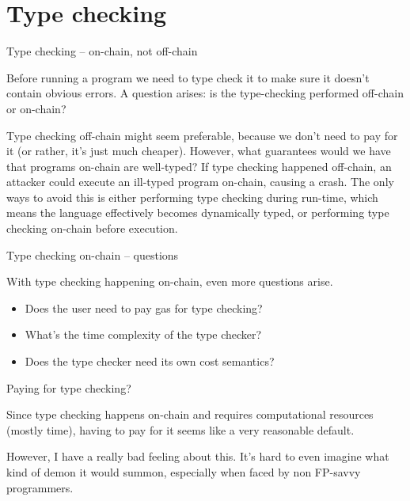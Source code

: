 \documentclass{beamer}
\begin{document}
\section{Type checking}

\begin{frame}{Type checking -- on-chain, not off-chain}

Before running a program we need to type check it to make sure it doesn't contain obvious errors. A question arises: is the type-checking performed off-chain or on-chain?

\vspace{2em}

Type checking off-chain might seem preferable, because we don't need to pay for it (or rather, it's just much cheaper). However, what guarantees would we have that programs on-chain are well-typed? If type checking happened off-chain, an attacker could execute an ill-typed program on-chain, causing a crash. The only ways to avoid this is either performing type checking during run-time, which means the language effectively becomes dynamically typed, or performing type checking on-chain before execution.

\end{frame}

\begin{frame}{Type checking on-chain -- questions}

With type checking happening on-chain, even more questions arise.

\begin{itemize}
  \item Does the user need to pay gas for type checking?
  \item What's the time complexity of the type checker?
  \item Does the type checker need its own cost semantics?
\end{itemize}

\end{frame}

\begin{frame}{Paying for type checking?}

Since type checking happens on-chain and requires computational resources (mostly time), having to pay for it seems like a very reasonable default.

\vspace{2em}

However, I have a really bad feeling about this. It's hard to even imagine what kind of demon it would summon, especially when faced by non FP-savvy programmers.

\end{frame}
\end{document}
